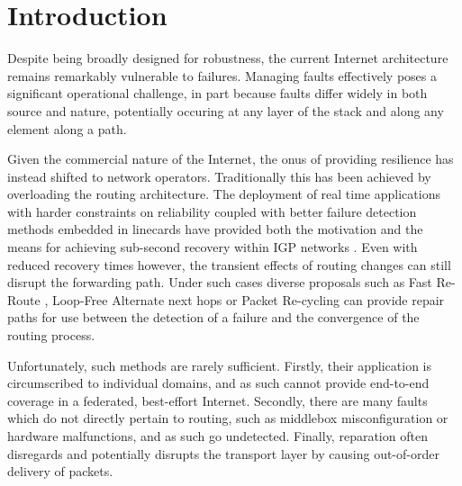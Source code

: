 \section{Introduction}

Despite being broadly designed for robustness, the current Internet architecture remains remarkably vulnerable to failures.
Managing faults effectively poses a significant operational challenge, in part because faults differ widely in both source and nature, potentially occuring at any layer of the stack and along any element along a path.

\LOREM
\LOREM

Given the commercial nature of the Internet, the onus of providing resilience has instead shifted to network operators.
Traditionally this has been achieved by overloading the routing architecture.
The deployment of real time applications with harder constraints on reliability coupled with better failure detection methods embedded in linecards have provided both the motivation and the means for achieving sub-second recovery within IGP networks \cite{}.
Even with reduced recovery times however, the transient effects of routing changes can still disrupt the forwarding path. 
Under such cases diverse proposals such as Fast Re-Route \cite{}, Loop-Free Alternate next hops \cite{} or Packet Re-cycling \cite{} can provide repair paths for use between the detection of a failure and the convergence of the routing process.

Unfortunately, such methods are rarely sufficient.
Firstly, their application is circumscribed to individual domains, and as such cannot provide end-to-end coverage in a federated, best-effort Internet.
Secondly, there are many faults which do not directly pertain to routing, such as middlebox misconfiguration or hardware malfunctions, and as such go undetected.
Finally, reparation often disregards and potentially disrupts the transport layer by causing out-of-order delivery of packets.

\LOREM
\LOREM
\LOREM

\LOREM
\LOREM


%


